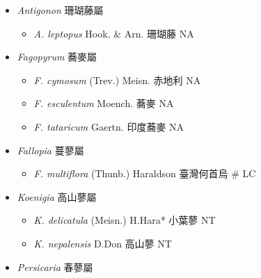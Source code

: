 
  \begin{itemize}
 \item[] \textit{Antigonon} 珊瑚藤屬
                                
  \begin{itemize}
        \item[] \textit{A. leptopus} Hook. \& Arn.  珊瑚藤   NA
  \end{itemize}
 \item[] \textit{Fagopyrum} 蕎麥屬
                                
  \begin{itemize}
        \item[] \textit{F. cymosum} (Trev.) Meisn.  赤地利   NA
        \item[] \textit{F. esculentum} Moench.  蕎麥   NA
        \item[] \textit{F. tataricum} Gaertn.  印度蕎麥   NA
  \end{itemize}
 \item[] \textit{Fallopia} 蔓蓼屬
                                
  \begin{itemize}
        \item[] \textit{F. multiflora} (Thunb.) Haraldson  臺灣何首烏  \# LC
  \end{itemize}
 \item[] \textit{Koenigia} 高山蓼屬
                                
  \begin{itemize}
        \item[] \textit{K. delicatula} (Meisn.) H.Hara*  小葉蓼   NT
        \item[] \textit{K. nepalensis} D.Don  高山蓼   NT
  \end{itemize}
 \item[] \textit{Persicaria} 春蓼屬
                                

\end{itemize}
